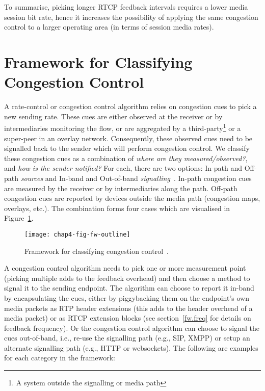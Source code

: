To summarise, picking longer RTCP feedback intervals requires a lower media
session bit rate, hence it increases the possibility of applying the same
congestion control to a larger operating area (in terms of session media
rates).

\section{Framework for Classifying Congestion Control}
\label{fw.fw}

A rate-control or congestion control algorithm relies on congestion cues to
pick a new sending rate. These cues are either observed at the receiver or by
intermediaries monitoring the flow, or are aggregated by a
third-party\footnote{A system outside the signalling or media path} or a
super-peer in an overlay network. Consequently, these observed cues need to be
signalled back to the sender which will perform congestion control. We classify
these congestion cues as a combination of \emph{where are they
measured/observed?}, and \emph{how is the sender notified?} For each, there are
two options: In-path and Off-path \emph{sources} and In-band and Out-of-band 
\emph{signalling}~\cite{Singh:PhDFw}. In-path congestion cues are measured
by the receiver or by intermediaries along the path. Off-path congestion
cues are reported by devices outside the media path (congestion maps,
overlays, etc.). The combination forms four cases which are visualised in
Figure~\ref{fig:4:fw}.

\begin{figure}
\texttt{[image: chap4-fig-fw-outline]}
\caption{Framework for classifying congestion control~\cite{Singh:PhDFw}.}
\label{fig:4:fw}
\end{figure}

A congestion control algorithm needs to pick one or more measurement point
(picking multiple adds to the feedback overhead) and then choose a method
to signal it to the sending endpoint. The algorithm can choose to report it in-band by
encapsulating the cues, either by piggybacking them on the endpoint's own media
packets as RTP header extensions (this adds to the header overhead of a media
packet) or as RTCP extension blocks (see section~\ref{fw.freq} for details on
feedback frequency). Or the congestion control algorithm can choose to signal
the cues out-of-band, i.e., re-use the signalling path (e.g., SIP, XMPP) or
setup an alternate signalling path (e.g., HTTP or websockets). The following are
examples for each category in the framework:

